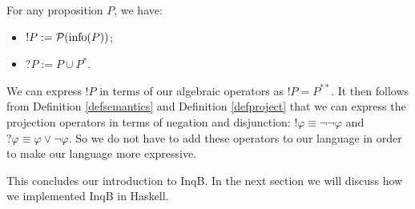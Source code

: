 \begin{defi}\label{defproject}
 For any proposition $P$, we have:
 \begin{itemize}
     \item $!P:= \mathcal{P}(\textrm{info}(P))$;
     \item $?P:= P\cup P^*$.
 \end{itemize}
\end{defi}

We can express $!P$ in terms of our algebraic operators as $!P=P^{**}$. It then follows from Definition \ref{defsemantics} and Definition \ref{defproject} that we can express the projection operators in terms of negation and disjunction: $!\varphi \equiv \neg\neg\varphi$ and $?\varphi\equiv \varphi \lor \neg \varphi$. So we do not have to add these operators to our language in order to make our language more expressive.

This concludes our introduction to \textsf{InqB}. In the next section we will discuss how we implemented \textsf{InqB} in Haskell. 


